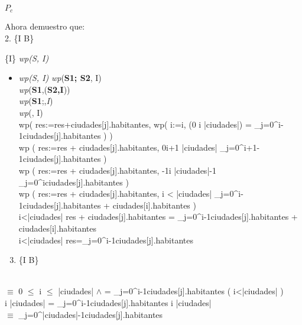 \documentclass[10pt,a4paper]{article}
\begin{document}
$P_{c}$ \implica {}

\vspace{0.3cm}

Ahora demuestro que:\\
\vspace{0.3cm}
2.  {\{I \land B\}}  {\{{I}\}  \implica \textit{wp(S, I)}
	
	\begin{itemize}
		\item 
		\textit{wp(S, I)}
		\equiv \textit{wp}(\textbf{S1; S2}, I)  \\
		\equiv \textit{wp}(\textbf{S1},(\textbf{S2,I}))  \\
		\equiv \textit{wp}(\textbf{S1};\;\;,\textit{I}) \\
		\equiv \textit{wp}(, I) \\
		\equiv wp\left( res:=res+ciudades[j].habitantes, wp\left( i:=i, (0 \leq i \leq |ciudades|) \land {} = \sum\limits_{j=0}^{i-1}ciudades[j].habitantes \right) \right) \\
		\equiv wp \left( res:=res + ciudades[j].habitantes, 0\leq i+1 \leq |ciudades| \wedge \sum\limits_{j=0}^{i+1-1}ciudades[j].habitantes \right) \\
		\equiv wp \left( res:=res + ciudades[j].habitantes, -1\leq i \leq |ciudades|-1 \wedge \sum\limits_{j=0}^{i}ciudades[j].habitantes \right)\\
		\equiv wp \left( res:=res + ciudades[j].habitantes, i < |ciudades| \wedge \sum\limits_{j=0}^{i-1}ciudades[j].habitantes + ciudades[i].habitantes \right)\\
		\equiv i<|ciudades| \wedge res + ciudades[j].habitantes = \sum\limits_{j=0}^{i-1}ciudades[j].habitantes + ciudades[i].habitantes \\
		\equiv i<|ciudades| \wedge res=\sum\limits_{j=0}^{i-1}ciudades[j].habitantes
	\end{itemize}
		
		\vspace{0.3cm}
		
		
		\begin{enumerate}
	    \setcounter{enumi}{2}  %
		\item {\{I \land  \neg B\}} \implica\text{Qc}
			
		\end{enumerate}
		
		\text{I $\wedge$ $\neg$ B} \\
		$\equiv$ 0 $\leq$ i $\leq$ |ciudades| $\land$  = \sum\limits_{j=0}^{i-1}ciudades[j].habitantes \wedge \neg \left( i<|ciudades| \right) \\
		 \leq i \leq |ciudades| \land {} = \sum\limits_{j=0}^{i-1}ciudades[j].habitantes \wedge i \geq|ciudades| \\
		$\equiv$ \sum\limits_{j=0}^{|ciudades|-1}ciudades[j].habitantes 
		
}
\end{document}
